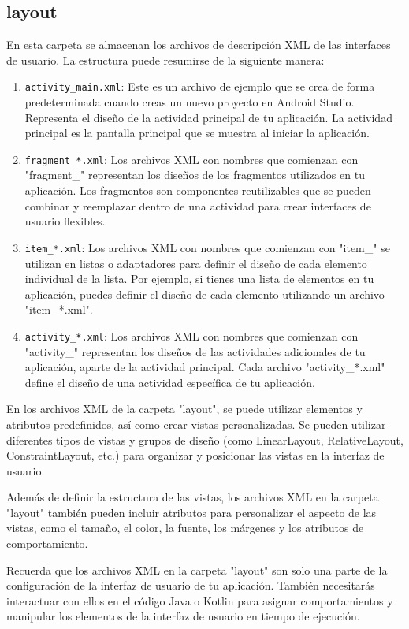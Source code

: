 \subsection{layout} En esta carpeta se almacenan los archivos de descripción XML de las interfaces de usuario. La estructura puede resumirse de la siguiente manera:
\begin{enumerate}
    \item \texttt{activity\_main.xml}: Este es un archivo de ejemplo que se crea de forma predeterminada cuando creas un nuevo proyecto en Android Studio. Representa el diseño de la actividad principal de tu aplicación. La actividad principal es la pantalla principal que se muestra al iniciar la aplicación.
    \item \texttt{fragment\_*.xml}: Los archivos XML con nombres que comienzan con "fragment\_" representan los diseños de los fragmentos utilizados en tu aplicación. Los fragmentos son componentes reutilizables que se pueden combinar y reemplazar dentro de una actividad para crear interfaces de usuario flexibles.
    \item \texttt{item\_*.xml}: Los archivos XML con nombres que comienzan con "item\_" se utilizan en listas o adaptadores para definir el diseño de cada elemento individual de la lista. Por ejemplo, si tienes una lista de elementos en tu aplicación, puedes definir el diseño de cada elemento utilizando un archivo "item\_*.xml".
    \item \texttt{activity\_*.xml}: Los archivos XML con nombres que comienzan con "activity\_" representan los diseños de las actividades adicionales de tu aplicación, aparte de la actividad principal. Cada archivo "activity\_*.xml" define el diseño de una actividad específica de tu aplicación.
\end{enumerate}

En los archivos XML de la carpeta "layout", se puede utilizar elementos y atributos predefinidos, así como crear vistas personalizadas. Se pueden utilizar diferentes tipos de vistas y grupos de diseño (como LinearLayout, RelativeLayout, ConstraintLayout, etc.) para organizar y posicionar las vistas en la interfaz de usuario.

Además de definir la estructura de las vistas, los archivos XML en la carpeta "layout" también pueden incluir atributos para personalizar el aspecto de las vistas, como el tamaño, el color, la fuente, los márgenes y los atributos de comportamiento.

Recuerda que los archivos XML en la carpeta "layout" son solo una parte de la configuración de la interfaz de usuario de tu aplicación. También necesitarás interactuar con ellos en el código Java o Kotlin para asignar comportamientos y manipular los elementos de la interfaz de usuario en tiempo de ejecución.

